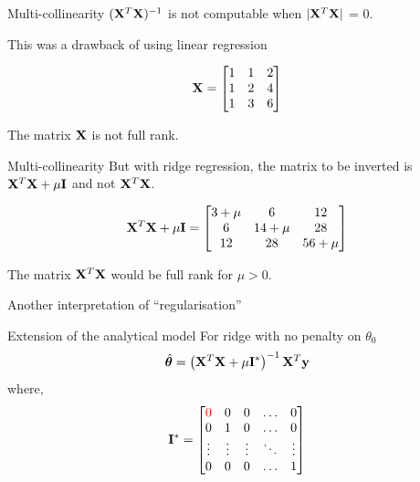 \documentclass{beamer}
\begin{document}
\begin{frame}{Multi-collinearity}
$(\mathbf{X}^{T}\mathbf{X})^{-1}$ is not computable when $|\mathbf{X}^{T}\mathbf{X}|$ = 0.

This was a drawback of using linear regression

\begin{equation*}
\mathbf{X} = \begin{bmatrix}
1 & 1& 2\\
1 & 2& 4\\
1 & 3& 6\\
\end{bmatrix}
\end{equation*}

The matrix $\mathbf{X}$ is not full rank. 
\end{frame}

\begin{frame}{Multi-collinearity}
But with ridge regression, the matrix to be inverted is $\mathbf{X}^{T}\mathbf{X} + \mu \mathbf{I}$ and not $\mathbf{X}^{T}\mathbf{X}$.

\begin{equation*}
\mathbf{X}^T\mathbf{X} + \mu \mathbf{I} = \begin{bmatrix}
3+\mu & 6& 12\\
6 & 14+\mu & 28\\
12 & 28& 56+\mu \\
\end{bmatrix}
\end{equation*}

The matrix $\mathbf{X}^T\mathbf{X}$ would be full rank for $\mu>0$. 

\pause Another interpretation of ``regularisation''
\end{frame}


\begin{frame}{Extension of the analytical model}
For ridge with no penalty on $\theta_0$
$$
\hat{\boldsymbol{\theta}} = \left(\mathbf{X}^T\mathbf{X}+\mu \mathbf{I}^*\right)^{-1}\mathbf{X}^T\mathbf{y}
$$
where, $$\mathbf{I}^* = \begin{bmatrix}
    \color{red}0 & 0 & 0 & \dots  & 0 \\
    0 & 1& 0 & \dots  & 0\\
    \vdots & \vdots & \vdots & \ddots & \vdots \\
    0 & 0 & 0 & \dots  & 1
\end{bmatrix}$$
\end{frame}


{
	
}


{
	
}
\end{document}
